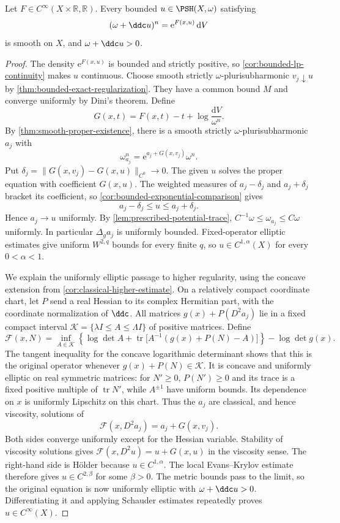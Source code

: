 \begin{theorem}\label{thm:bounded-hermitian-smoothness}
Let $F\in C^\infty(X\times\mathbb R,\mathbb R)$. Every bounded $u\in\PSH(X,\omega)$ satisfying
\[
 (\omega+\ddc u)^n=\mathrm e^{F(x,u)}\,\mathrm dV
\]
is smooth on $X$, and $\omega+\ddc u>0$.
\end{theorem}
\begin{proof}
The density $\mathrm e^{F(x,u)}$ is bounded and strictly positive, so \cref{cor:bounded-lp-continuity} makes $u$ continuous.
Choose smooth strictly $\omega$-plurisubharmonic $v_j\downarrow u$ by \cref{thm:bounded-exact-regularization}. They have a common bound $M$ and converge uniformly by Dini's theorem.
Define
\[
 G(x,t)=F(x,t)-t+\log\frac{\mathrm dV}{\omega^n}.
\]
By \cref{thm:smooth-proper-existence}, there is a smooth strictly $\omega$-plurisubharmonic $a_j$ with
\[
 \omega_{a_j}^n=\mathrm e^{a_j+G(x,v_j)}\omega^n.
\]
Put $\delta_j=\|G(x,v_j)-G(x,u)\|_{C^0}\to0$.
The given $u$ solves the proper equation with coefficient $G(x,u)$.
The weighted measures of $a_j-\delta_j$ and $a_j+\delta_j$ bracket its coefficient, so \cref{cor:bounded-exponential-comparison} gives
\[
 a_j-\delta_j\leq u\leq a_j+\delta_j.
\]
Hence $a_j\to u$ uniformly. By \cref{lem:prescribed-potential-trace},
$C^{-1}\omega\leq\omega_{a_j}\leq C\omega$ uniformly.
In particular $\Delta_ga_j$ is uniformly bounded. Fixed-operator elliptic estimates give uniform $W^{2,q}$ bounds for every finite $q$, so $u\in C^{1,\alpha}(X)$ for every $0<\alpha<1$.

We explain the uniformly elliptic passage to higher regularity, using the concave extension from \cref{cor:classical-higher-estimate}.
On a relatively compact coordinate chart, let $P$ send a real Hessian to its complex Hermitian part, with the coordinate normalization of $\ddc$.
All matrices $g(x)+P(D^2a_j)$ lie in a fixed compact interval $\mathcal K=\{\lambda I\leq A\leq\Lambda I\}$ of positive matrices. Define
\[
 \mathcal F(x,N)=\inf_{A\in\mathcal K}
 \left\{\log\det A+\operatorname{tr}\bigl[A^{-1}(g(x)+P(N)-A)\bigr]\right\}
       -\log\det g(x).
\]
The tangent inequality for the concave logarithmic determinant shows that this is the original operator whenever $g(x)+P(N)\in\mathcal K$.
It is concave and uniformly elliptic on real symmetric matrices: for $N'\geq0$, $P(N')\geq0$ and its trace is a fixed positive multiple of $\operatorname{tr}N'$, while $A^{\pm1}$ have uniform bounds. Its dependence on $x$ is uniformly Lipschitz on this chart.
Thus the $a_j$ are classical, and hence viscosity, solutions of
\[
 \mathcal F(x,D^2a_j)=a_j+G(x,v_j).
\]
Both sides converge uniformly except for the Hessian variable. Stability of viscosity solutions gives
$\mathcal F(x,D^2u)=u+G(x,u)$ in the viscosity sense.
The right-hand side is H\"older because $u\in C^{1,\alpha}$.
The local Evans--Krylov estimate therefore gives $u\in C^{2,\beta}$ for some $\beta>0$.
The metric bounds pass to the limit, so the original equation is now uniformly elliptic with $\omega+\ddc u>0$.
Differentiating it and applying Schauder estimates repeatedly proves $u\in C^\infty(X)$.
\end{proof}
